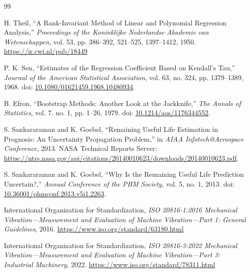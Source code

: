 \documentclass[12pt,a4paper]{article}
\begin{document}
\begin{thebibliography}{99}

H. Theil,
``A Rank-Invariant Method of Linear and Polynomial Regression Analysis,''
\emph{Proceedings of the Koninklijke Nederlandse Akademie van Wetenschappen},
vol. 53, pp. 386--392, 521--525, 1397--1412, 1950.
\url{https://ir.cwi.nl/pub/18449}

P. K. Sen,
``Estimates of the Regression Coefficient Based on Kendall's Tau,''
\emph{Journal of the American Statistical Association},
vol. 63, no. 324, pp. 1379--1389, 1968.
doi: \href{https://doi.org/10.1080/01621459.1968.10480934}{10.1080/01621459.1968.10480934}.

B. Efron,
``Bootstrap Methods: Another Look at the Jackknife,''
\emph{The Annals of Statistics}, vol. 7, no. 1, pp. 1--26, 1979.
doi: \href{https://doi.org/10.1214/aos/1176344552}{10.1214/aos/1176344552}.

S. Sankararaman and K. Goebel,
``Remaining Useful Life Estimation in Prognosis: An Uncertainty Propagation Problem,''
in \emph{AIAA Infotech@Aerospace Conference}, 2013.
NASA Technical Reports Server: \url{https://ntrs.nasa.gov/api/citations/20140010623/downloads/20140010623.pdf}.

S. Sankararaman and K. Goebel,
``Why Is the Remaining Useful Life Prediction Uncertain?,''
\emph{Annual Conference of the PHM Society}, vol. 5, no. 1, 2013.
doi: \href{https://doi.org/10.36001/phmconf.2013.v5i1.2263}{10.36001/phmconf.2013.v5i1.2263}.

International Organization for Standardization,
\emph{ISO 20816-1:2016 Mechanical Vibration---Measurement and Evaluation of Machine Vibration---Part 1: General Guidelines}, 2016.
\url{https://www.iso.org/standard/63180.html}

International Organization for Standardization,
\emph{ISO 20816-3:2022 Mechanical Vibration---Measurement and Evaluation of Machine Vibration---Part 3: Industrial Machinery}, 2022.
\url{https://www.iso.org/standard/78311.html}

\end{thebibliography}
\end{document}
